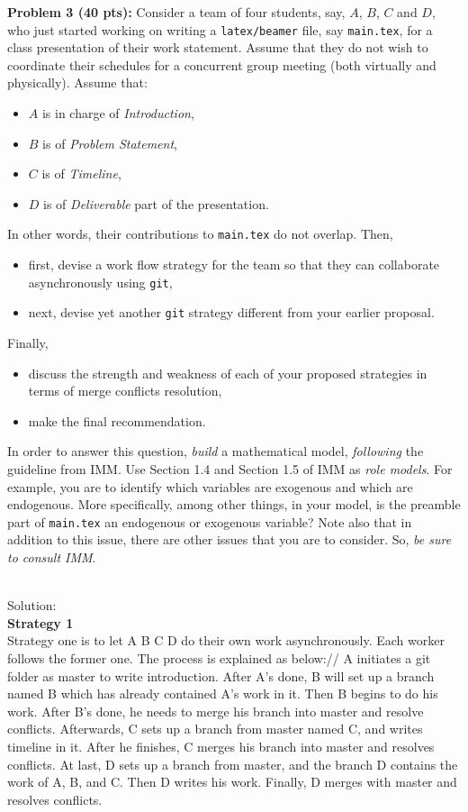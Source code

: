 \documentclass[12pt]{article}
\begin{document}
\newpage
\noindent\textbf{Problem 3 (40 pts):}
Consider a team of four students, say, $A$, $B$, $C$ and $D$, 
who just started working 
on writing a \texttt{latex/beamer} file, say \texttt{main.tex}, 
for a class presentation of their work statement.  
Assume that they do not wish to coordinate their schedules for a
concurrent group meeting (both virtually and physically).  
Assume that:
\begin{itemize}
\item $A$ is in charge of \emph{Introduction},
\item $B$ is of \emph{Problem Statement}, 
\item $C$ is of  \emph{Timeline},
\item $D$ is of \emph{Deliverable} part of the presentation.  
\end{itemize}
In other words, their contributions to \texttt{main.tex} do not overlap.
Then, 
\begin{itemize}
\item first, devise a work flow strategy for the team so that they can
  collaborate asynchronously using \texttt{git},
\item next, devise yet another \texttt{git} strategy different from your earlier
  proposal.  
\end{itemize}
Finally,
\begin{itemize}
\item discuss the strength and weakness of each of your proposed strategies in terms of merge
conflicts resolution,
\item make the final recommendation.  
\end{itemize}
In order to answer this question, \emph{build}
a mathematical model, \emph{following} the guideline from IMM. 
Use Section 1.4 and Section 1.5 of IMM as \emph{role models}.    
For example, you are to identify which variables  are exogenous 
and which are endogenous.  More specifically, among other things, 
in your model, is the preamble part of \texttt{main.tex} an endogenous 
or exogenous variable?  
Note also that in addition to this issue, there are other issues that
you are to consider.  So, \emph{be sure to consult IMM}. 



\noindent\ \\Solution:\\
\textbf{Strategy 1}\\
Strategy one is to let A B C D do their own work asynchronously. Each worker follows the former one. The process is explained as below:// A initiates a git folder as master to write introduction. After A\textquoteright s done, B will set up a branch named B which has already contained A\textquoteright s work in it. Then B begins to do his work. After B\textquoteright s done, he needs to merge his branch into master and resolve conflicts. Afterwards, C sets up a branch from master named C, and writes timeline in it. After he finishes, C merges his branch into master and resolves conflicts. At last, D sets up a branch from master, and the branch D contains the work of A, B, and C. Then D writes his work. Finally, D merges with master and resolves conflicts. 
\end{document}
